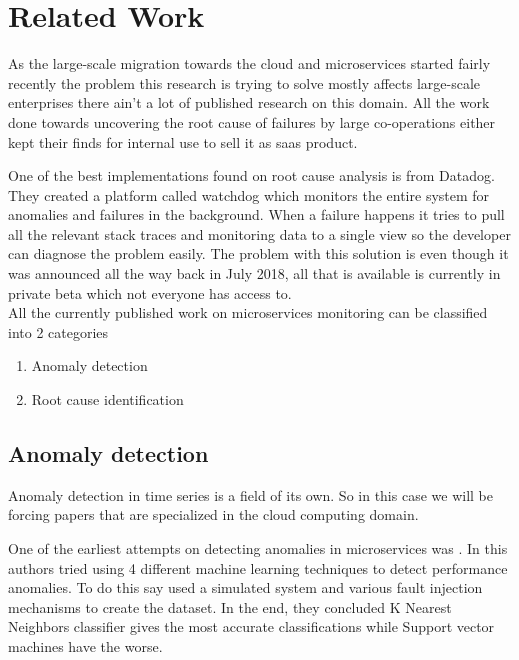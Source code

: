 \section{Related Work}

As the large-scale migration towards the cloud and microservices started fairly recently the problem this research is trying to solve mostly affects large-scale enterprises there ain't a lot of published research on this domain. All the work done towards uncovering the root cause of failures by large co-operations either kept their finds for internal use to sell it as \ac{saas} product. 

One of the best implementations found on root cause analysis is from Datadog. They created a platform called watchdog \citep{Watchdog76:online} which monitors the entire system for anomalies and failures in the background. When a failure happens it tries to pull all the relevant stack traces and monitoring data to a single view so the developer can diagnose the problem easily. The problem with this solution is even though it was announced all the way back in July 2018, all that is available is currently in private beta which not everyone has access to.
\\
All the currently published work on microservices monitoring can be classified into 2 categories
\begin{enumerate}
\item Anomaly detection
\item Root cause identification
\end{enumerate}

\subsection{Anomaly detection}

Anomaly detection in time series is a field of its own. So in this case we will be forcing papers that are specialized in the cloud computing domain.

One of the earliest attempts on detecting anomalies in microservices was \cite{du2018anomaly}. In this authors tried using 4 different machine learning techniques to detect performance anomalies. To do this say used a simulated system and various fault injection mechanisms to create the dataset. In the end, they concluded K Nearest Neighbors classifier gives the most accurate classifications while Support vector machines have the worse.

